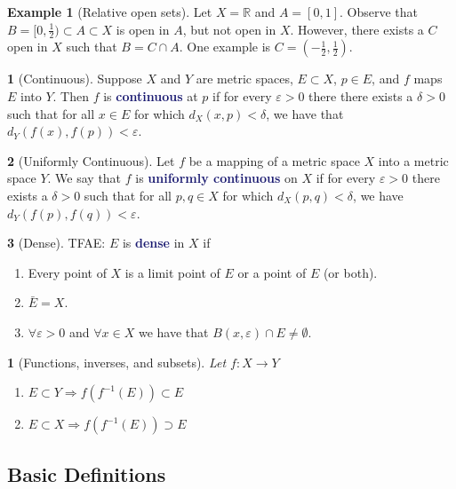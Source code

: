 \documentclass[12pt]{article}
\numberwithin{equation}{section}
\newcommand{\navy}[1]{\textcolor{MidnightBlue}{\bf #1}}
\theoremstyle{plain}
\newtheorem{theorem}{\color{ForestGreen}{\textbf{Theorem}}}[section]
\theoremstyle{definition}
\newtheorem{definition}{\color{MidnightBlue}{\textbf{Definition}}}[section]
\newtheorem{example}{\color{WildStrawberry}Example}[section]
\newcommand\inv[1]{#1^{-1}}
\def\imp{\Rightarrow}
\newcommand{\1}{\mathbbm 1}
\def\d{\delta}
\newcommand{\e}{\varepsilon}
\newcommand{\RR}{\mathbb R}
\begin{document}
\begin{example}[Relative open sets]
	Let $X = \RR$ and $A = [0,1]$. Observe that $B = [0,\frac{1}{2}) \subset A \subset X$ is open in $A$, but not open in $X$. However, there exists a $C$ open in $X$ such that $B = C \cap A$. One example is $C = (-\frac{1}{2}, \frac{1}{2})$.
\end{example}	


\begin{definition}[Continuous]
	Suppose $X$ and $Y$ are metric spaces, $E \subset X$, $p \in E$, and $f$ maps $E$ into $Y$. Then $f$ is \navy{continuous} at $p$ if for every $\e > 0$ there there exists a $\d > 0$ such that for all $x \in E$ for which $d_X(x,p) < \d$, we have that $d_Y(f(x), f(p)) < \e$. 
\end{definition}

\begin{definition}[Uniformly Continuous]
	Let $f$ be a mapping of a metric space $X$ into a metric space $Y$. We say that $f$ is \navy{uniformly continuous} on $X$ if for every $\e > 0$ there exists a $\d > 0$ such that for all $p,q \in X$ for which $d_X(p,q) < \delta$, we have $d_Y(f(p),f(q)) < \e$. 
\end{definition}

\begin{definition}[Dense] TFAE: $E$ is \navy{dense} in $X$ if
\begin{enumerate}
	\item  Every point of $X$ is a limit point of $E$ or a point of $E$ (or both). 
	\item $\bar{E} = X$.
	\item $\forall \e > 0$ and $\forall x \in X$ we have that $B(x,\e) \cap E \neq \emptyset$.
\end{enumerate} 
\end{definition}

\begin{theorem}[Functions, inverses, and subsets]
	Let $f: X \to Y$
	\begin{enumerate}
		\item $E \subset Y \imp f(\inv{f}(E)) \subset E$ 
		\item $E \subset X \imp f(\inv{f}(E)) \supset E$
	\end{enumerate}
\end{theorem}



\subsection{Basic Definitions}
\end{document}
